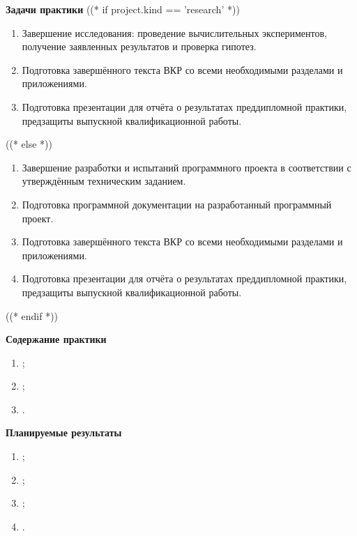 \documentclass[12pt,a4paper]{extarticle}
\begin{document}
\textbf{Задачи практики}
((* if project.kind == 'research' *))
\begin{enumerate}[leftmargin=1.4em, itemsep=2pt]
  \item Завершение исследования: проведение вычислительных экспериментов,
        получение заявленных результатов и проверка гипотез.
  \item Подготовка завершённого текста ВКР со всеми необходимыми разделами
        и приложениями.
  \item Подготовка презентации для отчёта о результатах преддипломной
        практики, предзащиты выпускной квалификационной работы.
\end{enumerate}
((* else *))
\begin{enumerate}[leftmargin=1.4em, itemsep=2pt]
  \item Завершение разработки и испытаний программного проекта в соответствии
        с утверждённым техническим заданием.
  \item Подготовка программной документации на разработанный программный проект.
  \item Подготовка завершённого текста ВКР со всеми необходимыми разделами
        и приложениями.
  \item Подготовка презентации для отчёта о результатах преддипломной
        практики, предзащиты выпускной квалификационной работы.
\end{enumerate}
((* endif *))

\textbf{Содержание практики}
\begin{enumerate}[leftmargin=1.4em, itemsep=2pt]
  \item {};
  \item {};
  \item {}.
\end{enumerate}

\textbf{Планируемые результаты}
\begin{enumerate}[leftmargin=1.4em, itemsep=2pt]
  \item {};
  \item {};
  \item {};
  \item {}.
\end{enumerate}
\end{document}
